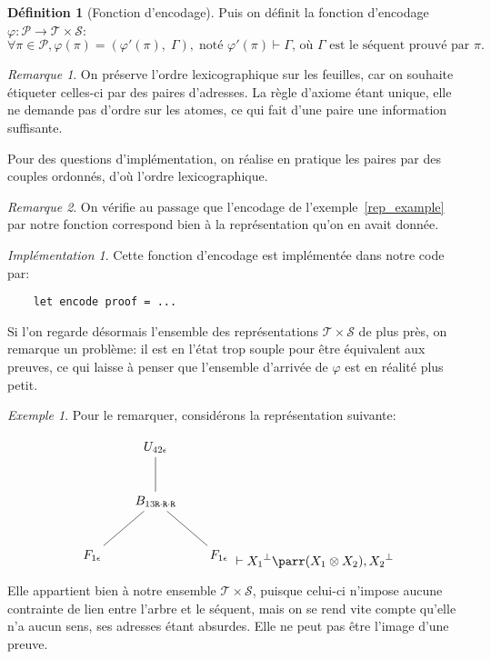 \documentclass[11pt,a4paper]{article}
\theoremstyle{plain}
\theoremstyle{definition}
\newtheorem{definition}{Définition}
\theoremstyle{remark}
\newtheorem{remark}{Remarque}
\newtheorem{example}{Exemple}
\newtheorem{implementation}{Implémentation}
\newcommand*{\orth}{^\perp}
\newcommand*{\tensor}{\otimes}
\newcommand*{\someproof}{\pi}
\newcommand*{\sequent}{\Gamma}
\newcommand*{\Right}{\textnormal{\texttt{R}}}
\newcommand*{\proofs}{\ensuremath{\mathcal{P}}}
\newcommand*{\sequents}{\ensuremath{\mathcal{S}}}
\newcommand*{\trees}{\ensuremath{\mathcal{T}}}
\newcommand*{\representationslarge}{\ensuremath{\trees \times \sequents}}
\newcommand*{\encode}{\ensuremath{\varphi}}
\begin{document}
\begin{definition}[Fonction d'encodage]
    Puis on définit la fonction d'encodage $\encode : \proofs \rightarrow \representationslarge$:
    \begin{equation*}
    \forall \someproof \in \proofs, \encode \left( \someproof \right) = \left( \encode' \left( \someproof \right), \; \sequent \right), \; \text{noté $\encode' \left( \someproof \right) \vdash \sequent$, où $\sequent$ est le séquent prouvé par $\someproof$.}
    \end{equation*}
\end{definition}

\begin{remark}
    On préserve l'ordre lexicographique sur les feuilles, car on souhaite étiqueter celles-ci par des paires d'adresses. La règle d'axiome étant unique, elle ne demande pas d'ordre sur les atomes, ce qui fait d'une paire une information suffisante. 
    
    Pour des questions d'implémentation, on réalise en pratique les paires par des couples ordonnés, d'où l'ordre lexicographique.
\end{remark}

\begin{remark}
    On vérifie au passage que l'encodage de l'exemple~\ref{rep_example} par notre fonction correspond bien à la représentation qu'on en avait donnée.
\end{remark}

\begin{implementation}
    Cette fonction d'encodage est implémentée dans notre code par:
    \begin{verbatim}
    let encode proof = ...
    \end{verbatim}
\end{implementation}

Si l'on regarde désormais l'ensemble des représentations $\representationslarge$ de plus près, on remarque un problème: il est en l'état trop souple pour être équivalent aux preuves, ce qui laisse à penser que l'ensemble d'arrivée de $\encode$ est en réalité plus petit.

\begin{example}
    Pour le remarquer, considérons la représentation suivante:
    
    \begin{equation*}
        \begin{tikzpicture}%
        [level distance=1.5cm,
        level 2/.style={sibling distance=3.5cm}]
        \node {$U_{42 \epsilon }$}
        child {node {$B_{13 \Right \cdot \Right \cdot \Right}$}
            child {node {$F_{1 \epsilon}$}}
            child {node {$F_{1 \epsilon}$}}
        };
        \end{tikzpicture}
        \vdash {X_1}\orth \parr (X_1 \tensor X_2), {X_2}\orth
    \end{equation*}

    Elle appartient bien à notre ensemble $\representationslarge$, puisque celui-ci n'impose aucune contrainte de lien entre l'arbre et le séquent, mais on se rend vite compte qu'elle n'a aucun sens, ses adresses étant absurdes. Elle ne peut pas être l'image d'une preuve.
\end{example}
\end{document}
